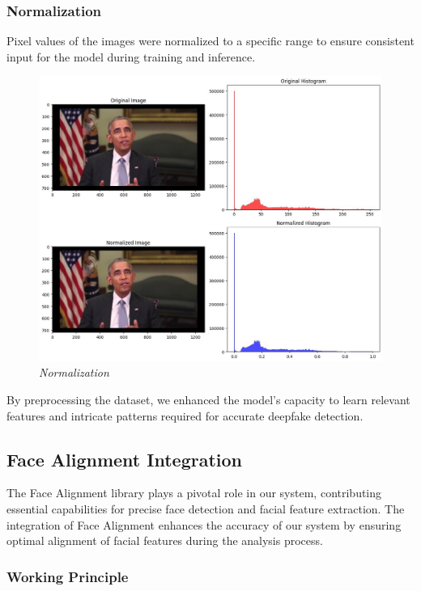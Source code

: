 \subsubsection{Normalization} Pixel values of the images were normalized to a specific range to ensure consistent input for the model during training and inference.

\begin{figure}[htbp]
    \centering
    \includegraphics[width=5in]{img/normalized.jpg}
    \caption{\textit{Normalization}}
\end{figure}

By preprocessing the dataset, we enhanced the model's capacity to learn relevant features and intricate patterns required for accurate deepfake detection.
\newpage

\subsection{Face Alignment Integration}

The Face Alignment library plays a pivotal role in our system, contributing essential capabilities for precise face detection and facial feature extraction. The integration of Face Alignment enhances the accuracy of our system by ensuring optimal alignment of facial features during the analysis process.

\subsubsection{Working Principle}

